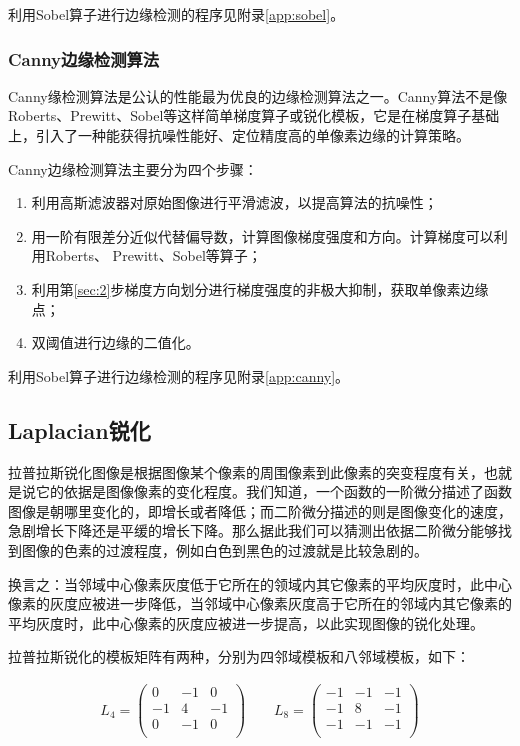 \documentclass{hitreport}
\begin{document}
利用Sobel算子进行边缘检测的程序见附录\ref{app:sobel}。


\subsubsection{Canny边缘检测算法}

Canny缘检测算法是公认的性能最为优良的边缘检测算法之一。Canny算法不是像Roberts、Prewitt、Sobel等这样简单梯度算子或锐化模板，它是在梯度算子基础上，引入了一种能获得抗噪性能好、定位精度高的单像素边缘的计算策略。

Canny边缘检测算法主要分为四个步骤：
\begin{enumerate}
\item 利用高斯滤波器对原始图像进行平滑滤波，以提高算法的抗噪性；
\item 用一阶有限差分近似代替偏导数，计算图像梯度强度和方向。计算梯度可以利用Roberts、 Prewitt、Sobel等算子；\label{sec:2}
\item 利用第\ref{sec:2}步梯度方向划分进行梯度强度的非极大抑制，获取单像素边缘点；
\item 双阈值进行边缘的二值化。
\end{enumerate}

利用Sobel算子进行边缘检测的程序见附录\ref{app:canny}。



\subsection{Laplacian锐化}

拉普拉斯锐化图像是根据图像某个像素的周围像素到此像素的突变程度有关，也就是说它的依据是图像像素的变化程度。我们知道，一个函数的一阶微分描述了函数图像是朝哪里变化的，即增长或者降低；而二阶微分描述的则是图像变化的速度，急剧增长下降还是平缓的增长下降。那么据此我们可以猜测出依据二阶微分能够找到图像的色素的过渡程度，例如白色到黑色的过渡就是比较急剧的。

换言之：当邻域中心像素灰度低于它所在的领域内其它像素的平均灰度时，此中心像素的灰度应被进一步降低，当邻域中心像素灰度高于它所在的邻域内其它像素的平均灰度时，此中心像素的灰度应被进一步提高，以此实现图像的锐化处理。

拉普拉斯锐化的模板矩阵有两种，分别为四邻域模板和八邻域模板，如下：

\begin{align}
L_4=\left( \begin{matrix}
	0&		-1&		0\\
	-1&		4&		-1\\
	0&		-1&		0\\
\end{matrix} \right)\qquad L_8=\left( \begin{matrix}
	-1&		-1&		-1\\
	-1&		8&		-1\\
	-1&		-1&		-1\\
\end{matrix} \right)
\end{align}
\end{document}
